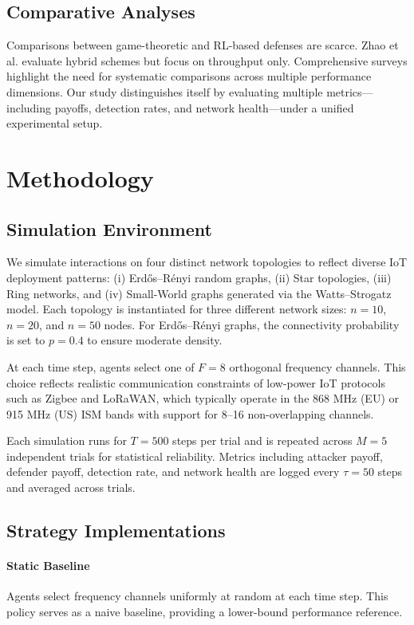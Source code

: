 \documentclass[conference]{IEEEtran}
\begin{document}
\subsection{Comparative Analyses}
Comparisons between game-theoretic and RL-based defenses are scarce. Zhao et al. \cite{zhao2020hybrid} evaluate hybrid schemes but focus on throughput only. Comprehensive surveys \cite{survey2022jamming} highlight the need for systematic comparisons across multiple performance dimensions. Our study distinguishes itself by evaluating multiple metrics—including payoffs, detection rates, and network health—under a unified experimental setup.


\section{Methodology}

\subsection{Simulation Environment}
We simulate interactions on four distinct network topologies to reflect diverse IoT deployment patterns: (i) Erd\H{o}s--R\'enyi random graphs, (ii) Star topologies, (iii) Ring networks, and (iv) Small-World graphs generated via the Watts–Strogatz model. Each topology is instantiated for three different network sizes: $n = 10$, $n = 20$, and $n = 50$ nodes. For Erd\H{o}s--R\'enyi graphs, the connectivity probability is set to $p=0.4$ to ensure moderate density.

At each time step, agents select one of $F=8$ orthogonal frequency channels. This choice reflects realistic communication constraints of low-power IoT protocols such as Zigbee and LoRaWAN, which typically operate in the 868 MHz (EU) or 915 MHz (US) ISM bands with support for 8–16 non-overlapping channels.

Each simulation runs for $T=500$ steps per trial and is repeated across $M=5$ independent trials for statistical reliability. Metrics including attacker payoff, defender payoff, detection rate, and network health are logged every $\tau = 50$ steps and averaged across trials.

\subsection{Strategy Implementations}
\paragraph{Static Baseline}
Agents select frequency channels uniformly at random at each time step. This policy serves as a naive baseline, providing a lower-bound performance reference.
\end{document}
